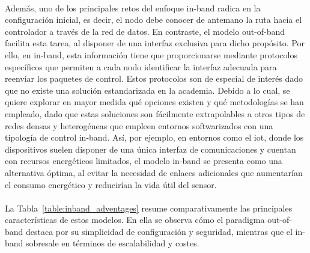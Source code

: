 \\
Además, uno de los principales retos del enfoque in-band radica en la configuración inicial, es decir, el nodo debe conocer de antemano la ruta hacia el controlador a través de la red de datos. En contraste, el modelo out-of-band facilita esta tarea, al disponer de una interfaz exclusiva para dicho propósito. Por ello, en in-band, esta información tiene que proporcionarse mediante protocolos específicos que permiten a cada nodo identificar la interfaz adecuada para reenviar los paquetes de control. Estos protocolos son de especial de interés dado que no existe una solución estandarizada en la academia. Debido a lo cual, se quiere explorar en mayor medida qué opciones existen y qué metodologías se han empleado, dado que estas soluciones son fácilmente extrapolables a otros tipos de redes densas y heterogéneas que empleen entornos softwarizados con una tipología de control in-band. Así, por ejemplo, en entornos como el \gls{iot}, donde los dispositivos suelen disponer de una única interfaz de comunicaciones y cuentan con recursos energéticos limitados, el modelo in-band se presenta como una alternativa óptima, al evitar la necesidad de enlaces adicionales que aumentarían el consumo energético y reducirían la vida útil del sensor. \\
\\
La Tabla~\ref{table:inband_adventages} resume comparativamente las principales características de estos modelos. En ella se observa cómo el paradigma out-of-band destaca por su simplicidad de configuración y seguridad, mientras que el in-band sobresale en términos de escalabilidad y costes. 

\begin{table}[ht]
\centering
{}
\caption{Características del control \textit{in-band} y \textit{out-of-band}}
\label{table:inband_adventages}
\end{table}


